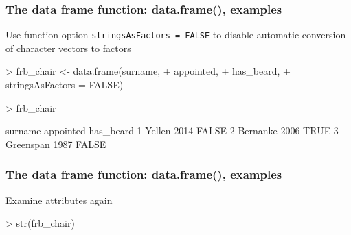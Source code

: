 \documentclass{beamer}
\newcommand{\R}[1]{\texttt{#1}}
\begin{document}
\begin{frame}[fragile]
\frametitle{The data frame function: data.frame(), examples}

Use function option \R{stringsAsFactors = FALSE} to disable automatic conversion of character vectors to factors
\begin{Schunk}
\begin{Sinput}
> frb_chair <- data.frame(surname,    
+                         appointed,
+                         has_beard,
+                         stringsAsFactors = FALSE)
\end{Sinput}
\end{Schunk}
\pause
\begin{Schunk}
\begin{Sinput}
> frb_chair
\end{Sinput}
\begin{Soutput}
    surname appointed has_beard
1    Yellen      2014     FALSE
2  Bernanke      2006      TRUE
3 Greenspan      1987     FALSE
\end{Soutput}
\end{Schunk}

\end{frame}


\begin{frame}[fragile]
\frametitle{The data frame function: data.frame(), examples}

Examine attributes again
\begin{Schunk}
\begin{Sinput}
> str(frb_chair)
\end{Sinput}
\end{Schunk}
\pause
\begin{Schunk}
\end{Schunk}

\end{frame}




\end{document}
